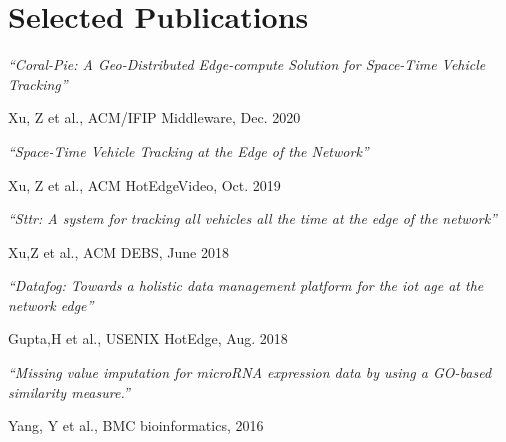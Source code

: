\section{Selected Publications}
\small{%

\parbox[t][][t]{\linewidth}{
	\parbox{\linewidth}{\textit{``Coral-Pie: A Geo-Distributed Edge-compute Solution for Space-Time Vehicle Tracking''}}
	\smallbreak
	\parbox{\linewidth}{{Xu, Z et al.}, {ACM/IFIP Middleware, Dec. 2020}}
  \bigbreak
}


\parbox[t][][t]{\linewidth}{
	\parbox{\linewidth}{\textit{``Space-Time Vehicle Tracking at the Edge of the Network''}}
	\smallbreak
	\parbox{\linewidth}{{Xu, Z et al.}, {ACM HotEdgeVideo, Oct. 2019}}
  \bigbreak
}

\parbox[t][][t]{\linewidth}{
	\parbox{\linewidth}{\textit{``Sttr: A system for tracking all vehicles all the time at the edge of the network''}}
	\smallbreak
	\parbox{\linewidth}{{Xu,Z et al.}, {ACM DEBS, June 2018}}
	\bigbreak
}

\parbox[t][][t]{\linewidth}{
	\parbox{\linewidth}{\textit{``Datafog: Towards a holistic data management platform for the iot age at the network edge''}}
	\smallbreak
	\parbox{\linewidth}{{Gupta,H et al.}, {USENIX HotEdge, Aug. 2018}}
	\bigbreak
}

\parbox[t][][t]{\linewidth}{
	\parbox{\linewidth}{\textit{``Missing value imputation for microRNA expression data by using a GO-based similarity measure.''}}
	\smallbreak
	\parbox{\linewidth}{{Yang, Y et al.}, {BMC bioinformatics, 2016}}
}

}

